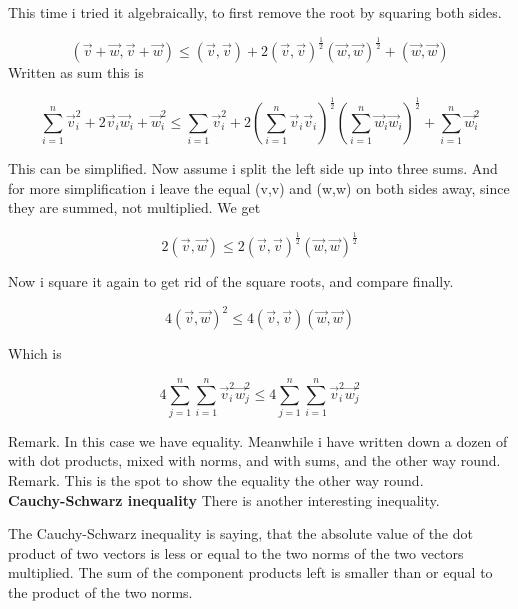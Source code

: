 \documentclass[a4paper]{article}
\begin{document}
 This time i tried it algebraically, to first remove the root by squaring both sides. 

\begin{displaymath}
(\vec{v}+\vec{w}, \vec{v}+\vec{w}) \leq (\vec{v},\vec{v}) + 2(\vec{v},\vec{v})^{\frac{1}{2}}(\vec{w},\vec{w})^{\frac{1}{2}} + (\vec{w},\vec{w})
\end{displaymath}
Written as sum this is

\begin{displaymath}
\sum_{i=1}^{n}\vec{v}_{i}^{2}+2\vec{v}_{i}\vec{w}_{i}+\vec{w}_{i}^{2} \leq \sum_{i=1}\vec{v}_{i}^{2}+2(\sum_{i=1}^{n}\vec{v}_{i}\vec{v}_{i})^{\frac{1}{2}}(\sum_{i=1}^{n}\vec{w}_{i}\vec{w}_{i})^{\frac{1}{2}}+\sum_{i=1}^{n}\vec{w}_{i}^{2}
\end{displaymath}

This can be simplified. Now assume i split the left side up into three sums. And for more simplification i leave the equal (v,v) and (w,w) on both sides away, since they are summed, not multiplied. We get

\begin{displaymath}
2(\vec{v},\vec{w}) \leq 2(\vec{v},\vec{v})^{\frac{1}{2}}(\vec{w},\vec{w})^{\frac{1}{2}}
\end{displaymath}

Now i square it again to get rid of the square roots, and compare finally.

\begin{displaymath}
4(\vec{v}, \vec{w})^{2} \leq 4(\vec{v},\vec{v})(\vec{w},\vec{w}) 
\end{displaymath}

Which is 

\begin{displaymath}
4\sum_{j=1}^{n}\sum_{i=1}^{n}\vec{v}_{i}^{2}\vec{w}_{j}^{2} \leq 4\sum_{j=1}^{n}\sum_{i=1}^{n}\vec{v}_{i}^{2}\vec{w}_{j}^{2}
\end{displaymath}

Remark. In this case we have equality. Meanwhile i have written down a dozen of with dot products, mixed with norms, and with sums, and the other way round. \\

Remark. This is the spot to show the equality the other way round.\\


\textbf{Cauchy-Schwarz inequality} There is another interesting inequality.

The Cauchy-Schwarz inequality is saying, that the absolute value of the dot product of two vectors is less or equal to the two norms of the two vectors multiplied. The sum of the component products left is smaller than or equal to the product of the two norms.\\
\end{document}
